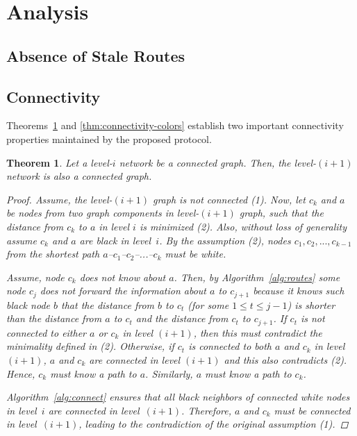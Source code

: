 \documentclass[conference]{IEEEtran}
\newtheorem{thm}{Theorem}
\theoremstyle{definition}
\begin{document}
\section{Analysis}
\label{sec:analysis}

\subsection{Absence of Stale Routes}
\label{sec:analysis:staleroutes}


\subsection{Connectivity}
\label{sec:analysis:connectivity}

Theorems~\ref{thm:connectivity-levels} and \ref{thm:connectivity-colors} establish 
two important connectivity properties maintained by the proposed protocol.

\begin{thm}
    Let a level-$i$ network be a connected graph. Then, the level-$(i+1)$ network is also a connected graph.

    \begin{proof}
        Assume, the level-$(i+1)$ graph is not connected (1). Now, let $c_k$ and $a$ be nodes from two graph components in level-$(i+1)$ graph, such that the distance from $c_k$ to $a$ in level $i$ is minimized (2). Also, without loss of generality assume $c_k$ and $a$ are black in level~$i$. By the assumption (2), nodes $c_1,c_2,...,c_{k-1}$ from the shortest path  $a$--$c_1$--$c_2$--...--$c_k$ must be white.

        Assume, node $c_k$ does not know about $a$. Then, by Algorithm~\ref{alg:routes} some node $c_j$ does not forward the information about $a$ to $c_{j+1}$ because it knows such black node $b$ that the distance from $b$ to $c_t$ (for some $1 \le t \le j - 1$) is shorter than the distance from $a$ to $c_t$ and the distance from $c_t$ to $c_{j+1}$. If $c_t$ is not connected to either $a$ or $c_k$ in level $(i+1)$, then this must contradict the minimality defined in (2). Otherwise, if $c_t$ is connected to both $a$ and $c_k$ in level $(i+1)$, $a$ and $c_k$ are connected in level $(i+1)$ and this also contradicts (2). Hence, $c_k$ must know a path to $a$. Similarly, $a$ must know a path to $c_k$.

        Algorithm~\ref{alg:connect} ensures that all black neighbors of connected white nodes in level~$i$ are connected in level~$(i+1)$. Therefore, $a$ and $c_k$ must be connected in level~$(i+1)$, leading to the contradiction of the original assumption (1).
    \end{proof}

    \label{thm:connectivity-levels}
\end{thm}
\end{document}
